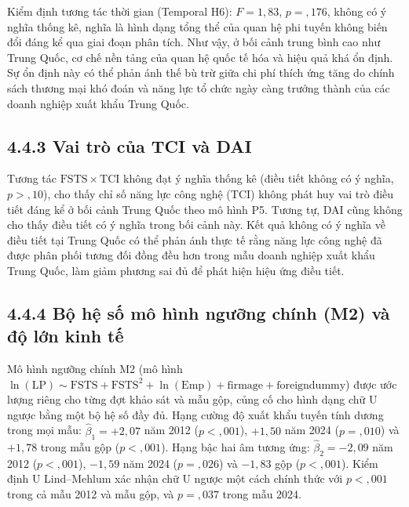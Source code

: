 \documentclass[
  a4paper,
  13pt]{extreport}
\begin{document}
Kiểm định tương tác thời gian (Temporal H6): \(F = 1{,}83\),
\(p = {,}176\), không có ý nghĩa thống kê, nghĩa là hình dạng tổng thể
của quan hệ phi tuyến không biến đổi đáng kể qua giai đoạn phân tích.
Như vậy, ở bối cảnh trung bình cao như Trung Quốc, cơ chế nền tảng của
quan hệ quốc tế hóa và hiệu quả khá ổn định. Sự ổn định này có thể phản
ánh thế bù trừ giữa chi phí thích ứng tăng do chính sách thương mại khó
đoán và năng lực tổ chức ngày càng trưởng thành của các doanh nghiệp
xuất khẩu Trung Quốc.

\hypertarget{vai-truxf2-cux1ee7a-tci-vuxe0-dai}{%
\subsection{4.4.3 Vai trò của TCI và
DAI}\label{vai-truxf2-cux1ee7a-tci-vuxe0-dai}}

Tương tác \(\mathrm{FSTS} \times \mathrm{TCI}\) không đạt ý nghĩa thống
kê (điều tiết không có ý nghĩa, \(p > {,}10\)), cho thấy chỉ số năng lực
công nghệ (TCI) không phát huy vai trò điều tiết đáng kể ở bối cảnh
Trung Quốc theo mô hình P5. Tương tự, DAI cũng không cho thấy điều tiết
có ý nghĩa trong bối cảnh này. Kết quả không có ý nghĩa về điều tiết tại
Trung Quốc có thể phản ánh thực tế rằng năng lực công nghệ đã được phân
phối tương đối đồng đều hơn trong mẫu doanh nghiệp xuất khẩu Trung Quốc,
làm giảm phương sai đủ để phát hiện hiệu ứng điều tiết.

\hypertarget{bux1ed9-hux1ec7-sux1ed1-muxf4-huxecnh-ngux1b0ux1ee1ng-chuxednh-m2-vuxe0-ux111ux1ed9-lux1edbn-kinh-tux1ebf}{%
\subsection{4.4.4 Bộ hệ số mô hình ngưỡng chính (M2) và độ lớn kinh
tế}\label{bux1ed9-hux1ec7-sux1ed1-muxf4-huxecnh-ngux1b0ux1ee1ng-chuxednh-m2-vuxe0-ux111ux1ed9-lux1edbn-kinh-tux1ebf}}

Mô hình ngưỡng chính M2 (mô hình
\(\ln(\mathrm{LP}) \sim \mathrm{FSTS} + \mathrm{FSTS}^2 + \ln(\mathrm{Emp}) + \text{firmage} + \text{foreigndummy}\))
được ước lượng riêng cho từng đợt khảo sát và mẫu gộp, củng cố cho hình
dạng chữ U ngược bằng một bộ hệ số đầy đủ. Hạng cường độ xuất khẩu tuyến
tính dương trong mọi mẫu: \(\hat{\beta}_1 = +2{,}07\) năm 2012
(\(p < {,}001\)), \(+1{,}50\) năm 2024 (\(p = {,}010\)) và \(+1{,}78\)
trong mẫu gộp (\(p < {,}001\)). Hạng bậc hai âm tương ứng:
\(\hat{\beta}_2 = -2{,}09\) năm 2012 (\(p < {,}001\)), \(-1{,}59\) năm
2024 (\(p = {,}026\)) và \(-1{,}83\) gộp (\(p < {,}001\)). Kiểm định U
Lind--Mehlum xác nhận chữ U ngược một cách chính thức với \(p < {,}001\)
trong cả mẫu 2012 và mẫu gộp, và \(p = {,}037\) trong mẫu 2024.
\end{document}
